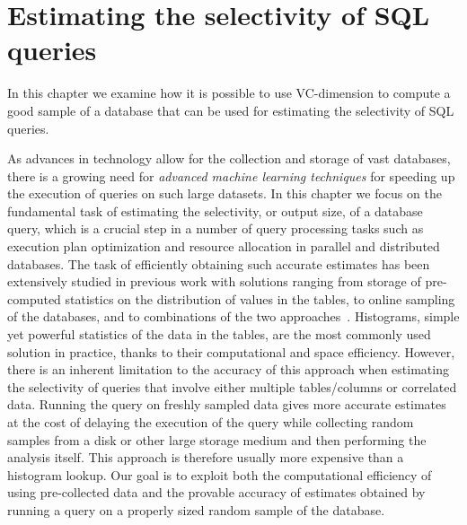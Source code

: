 \chapter[Estimating the Selectivity of SQL Queries]{Estimating the selectivity of SQL
queries\protect{}}\label{ch:vcfreq}

In this chapter we examine how it is possible to use VC-dimension to compute a
good sample of a database that can be used for estimating the selectivity of SQL
queries.


As advances in technology allow for the collection and storage of vast
databases, there is a growing need for \emph{advanced machine learning
techniques} for speeding up the execution of queries on such large datasets. In
this chapter we focus on the fundamental task of estimating the selectivity, or
output size, of a database query, which is a crucial step in a number of query
processing tasks such as execution plan optimization and resource allocation in
parallel and distributed databases. The task of efficiently obtaining such
accurate estimates has been extensively studied in previous work with solutions
ranging from storage of pre-computed statistics on the distribution of values in
the tables, to online sampling of the databases, and to combinations of the two
approaches~\citep{LiptonN95,LiptonNS90,HaasS92,HouOD91,HaasS95,GangulyGMS96,GantiLR00,GibbonsM98,HouOT88,LarsonLZZ07,PoosalaI97}.
Histograms, simple yet powerful statistics of the data in the tables, are the most
commonly used solution in practice, thanks to their computational and space
efficiency. However, there is an inherent limitation to the accuracy of this
approach when estimating the selectivity of queries that involve either multiple
tables/columns or correlated data. Running the query on freshly sampled data
gives more accurate estimates at the cost of delaying the execution of the query
while collecting random samples from a disk or other large storage medium and
then performing the analysis itself. This approach is therefore usually more
expensive than a histogram lookup. Our goal is to exploit both the computational
efficiency of using pre-collected data and the provable accuracy of estimates
obtained by running a query on a properly sized random sample of the database.

